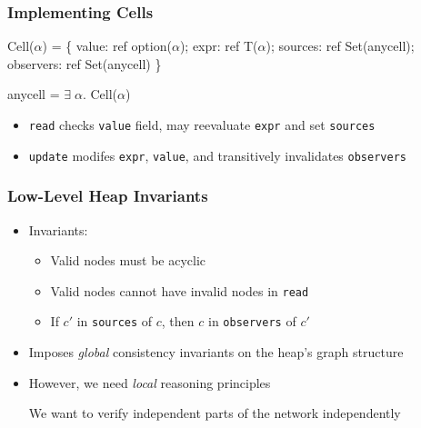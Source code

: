 \documentclass[svgnames]{beamer}
\begin{document}
\begin{frame}[fragile]
  \frametitle{Implementing Cells}
  \begin{block}{}
  \begin{semiverbatim}
    Cell(\(\alpha\)) = \{
      value:     ref option(\(\alpha\));     
      expr:      ref T(\(\alpha\));          
      sources:   ref Set(anycell);  
      observers: ref Set(anycell)   
    \}

    anycell = \(\exists\;\alpha.\) Cell(\(\alpha\))
  \end{semiverbatim}
  \end{block}
  \begin{itemize}
  \item \texttt{read} checks \texttt{value} field, may reevaluate \texttt{expr} and set \texttt{sources}
  \item \texttt{update} modifes \texttt{expr}, \texttt{value}, and transitively invalidates \texttt{observers}
  \end{itemize}
\end{frame}


\begin{frame}
  \frametitle{Low-Level Heap Invariants}

    \begin{itemize}
      \item Invariants: 
        \begin{itemize}
        \item Valid nodes must be acyclic
        \item Valid nodes cannot have invalid nodes in \texttt{read}
        \item If $c'$ in \texttt{sources} of $c$, then $c$ in \texttt{observers} of $c'$
        \end{itemize}

    \item Imposes \emph{global} consistency invariants on the heap's 
      graph structure

    \item However, we need \emph{local} reasoning principles

      We want to verify independent parts of the network independently
    \end{itemize}
\end{frame}
\end{document}
